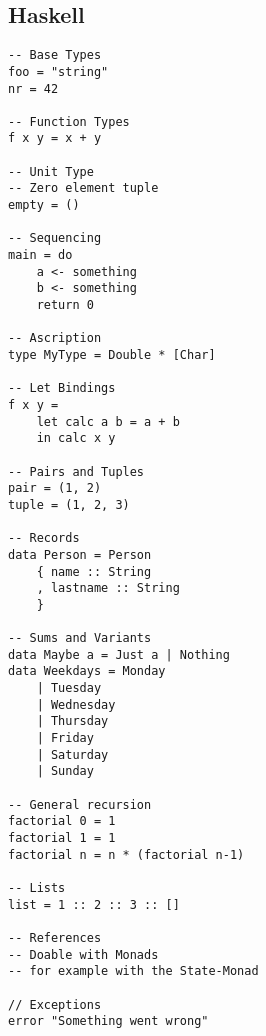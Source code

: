 \subsection*{Haskell}

\begin{verbatim}
-- Base Types
foo = "string"
nr = 42

-- Function Types
f x y = x + y

-- Unit Type
-- Zero element tuple
empty = ()

-- Sequencing
main = do
    a <- something
    b <- something
    return 0

-- Ascription
type MyType = Double * [Char]

-- Let Bindings
f x y =
    let calc a b = a + b
    in calc x y

-- Pairs and Tuples
pair = (1, 2)
tuple = (1, 2, 3)

-- Records
data Person = Person
    { name :: String
    , lastname :: String
    }

-- Sums and Variants
data Maybe a = Just a | Nothing
data Weekdays = Monday
    | Tuesday
    | Wednesday
    | Thursday
    | Friday
    | Saturday
    | Sunday

-- General recursion
factorial 0 = 1
factorial 1 = 1
factorial n = n * (factorial n-1)

-- Lists
list = 1 :: 2 :: 3 :: []

-- References
-- Doable with Monads
-- for example with the State-Monad

// Exceptions
error "Something went wrong"
\end{verbatim}
